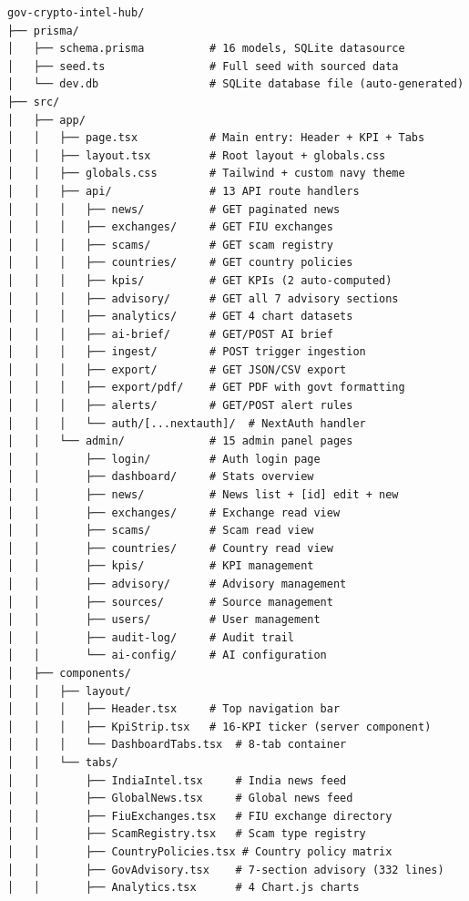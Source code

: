 \documentclass[12pt,a4paper]{article}
\begin{document}
\begin{lstlisting}[caption={Directory Tree},label={lst:tree}]
gov-crypto-intel-hub/
├── prisma/
│   ├── schema.prisma          # 16 models, SQLite datasource
│   ├── seed.ts                # Full seed with sourced data
│   └── dev.db                 # SQLite database file (auto-generated)
├── src/
│   ├── app/
│   │   ├── page.tsx           # Main entry: Header + KPI + Tabs
│   │   ├── layout.tsx         # Root layout + globals.css
│   │   ├── globals.css        # Tailwind + custom navy theme
│   │   ├── api/               # 13 API route handlers
│   │   │   ├── news/          # GET paginated news
│   │   │   ├── exchanges/     # GET FIU exchanges
│   │   │   ├── scams/         # GET scam registry
│   │   │   ├── countries/     # GET country policies
│   │   │   ├── kpis/          # GET KPIs (2 auto-computed)
│   │   │   ├── advisory/      # GET all 7 advisory sections
│   │   │   ├── analytics/     # GET 4 chart datasets
│   │   │   ├── ai-brief/      # GET/POST AI brief
│   │   │   ├── ingest/        # POST trigger ingestion
│   │   │   ├── export/        # GET JSON/CSV export
│   │   │   ├── export/pdf/    # GET PDF with govt formatting
│   │   │   ├── alerts/        # GET/POST alert rules
│   │   │   └── auth/[...nextauth]/  # NextAuth handler
│   │   └── admin/             # 15 admin panel pages
│   │       ├── login/         # Auth login page
│   │       ├── dashboard/     # Stats overview
│   │       ├── news/          # News list + [id] edit + new
│   │       ├── exchanges/     # Exchange read view
│   │       ├── scams/         # Scam read view
│   │       ├── countries/     # Country read view
│   │       ├── kpis/          # KPI management
│   │       ├── advisory/      # Advisory management
│   │       ├── sources/       # Source management
│   │       ├── users/         # User management
│   │       ├── audit-log/     # Audit trail
│   │       └── ai-config/     # AI configuration
│   ├── components/
│   │   ├── layout/
│   │   │   ├── Header.tsx     # Top navigation bar
│   │   │   ├── KpiStrip.tsx   # 16-KPI ticker (server component)
│   │   │   └── DashboardTabs.tsx  # 8-tab container
│   │   └── tabs/
│   │       ├── IndiaIntel.tsx     # India news feed
│   │       ├── GlobalNews.tsx     # Global news feed
│   │       ├── FiuExchanges.tsx   # FIU exchange directory
│   │       ├── ScamRegistry.tsx   # Scam type registry
│   │       ├── CountryPolicies.tsx # Country policy matrix
│   │       ├── GovAdvisory.tsx    # 7-section advisory (332 lines)
│   │       ├── Analytics.tsx      # 4 Chart.js charts

\end{lstlisting}
\end{document}
